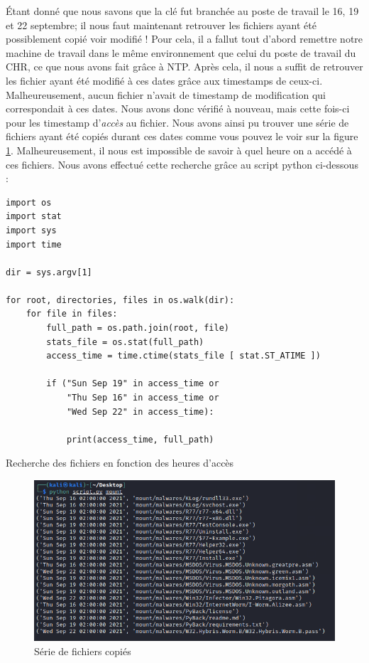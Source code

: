 \documentclass[a4paper]{article}
\newenvironment{code}{\captionsetup{type=listing}}{}
\begin{document}
Étant donné que nous savons que la clé fut branchée au poste de travail le 16, 19 et 22 septembre; il nous faut maintenant retrouver les fichiers ayant été possiblement copié voir modifié ! Pour cela, il a fallut tout d'abord remettre notre machine de travail dans le même environnement que celui du poste de travail du CHR, ce que nous avons fait grâce à NTP. Après cela, il nous a suffit de retrouver les fichier ayant été modifié à ces dates grâce aux timestamps de ceux-ci. Malheureusement, aucun fichier n'avait de timestamp de modification qui correspondait à ces dates. Nous avons donc vérifié à nouveau, mais cette fois-ci pour les timestamp d'\emph{accès} au fichier. Nous avons ainsi pu trouver une série de fichiers ayant été copiés durant ces dates comme vous pouvez le voir sur la figure \ref{copied_files}. Malheureusement, il nous est impossible de savoir à quel heure on a accédé à ces fichiers. Nous avons effectué cette recherche grâce au script python ci-dessous :
\begin{code}\small
\begin{verbatim}
import os
import stat
import sys
import time

dir = sys.argv[1]

for root, directories, files in os.walk(dir):
    for file in files:
        full_path = os.path.join(root, file)
        stats_file = os.stat(full_path)
        access_time = time.ctime(stats_file [ stat.ST_ATIME ])

        if ("Sun Sep 19" in access_time or 
            "Thu Sep 16" in access_time or
            "Wed Sep 22" in access_time):
            
            print(access_time, full_path)
\end{verbatim}
\caption{Recherche des fichiers en fonction des heures d'accès}
\end{code}

\begin{figure}[H]
    \centering
    \includegraphics[width=15cm]{images/filemodified.PNG}
    \caption{Série de fichiers copiés}
    \label{copied_files}
\end{figure}
\end{document}
